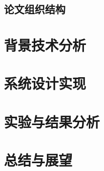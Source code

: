 \documentclass[forprint]{WHUBachelor}
\begin{document}
\section{论文组织结构}
 
\chapter{背景技术分析}
\chapter{系统设计实现}
\chapter{实验与结果分析}
\chapter{总结与展望}


{} %




\backmatter

\cleardoublepage
\end{document}
